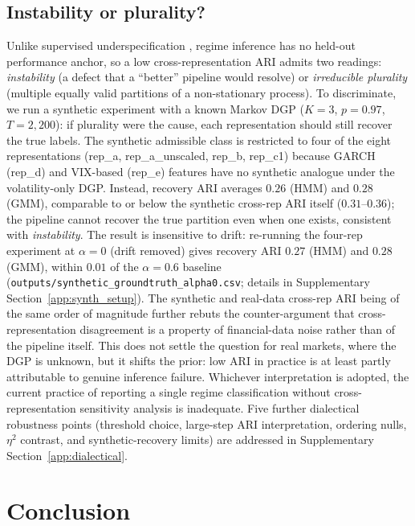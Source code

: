 \documentclass[preprint,12pt,authoryear]{elsarticle}
\begin{document}
\subsection{Instability or plurality?}
\label{sec:discussion}

Unlike supervised underspecification \citep{DAmouretal2022}, regime inference has no held-out performance anchor, so a low cross-representation ARI admits two readings: \emph{instability} (a defect that a ``better'' pipeline would resolve) or \emph{irreducible plurality} (multiple equally valid partitions of a non-stationary process). To discriminate, we run a synthetic experiment with a known Markov DGP ($K=3$, $p=0.97$, $T=2{,}200$): if plurality were the cause, each representation should still recover the true labels. The synthetic admissible class is restricted to four of the eight representations (rep\_a, rep\_a\_unscaled, rep\_b, rep\_c1) because GARCH (rep\_d) and VIX-based (rep\_e) features have no synthetic analogue under the volatility-only DGP. Instead, recovery ARI averages $0.26$ (HMM) and $0.28$ (GMM), comparable to or below the synthetic cross-rep ARI itself ($0.31$--$0.36$); the pipeline cannot recover the true partition even when one exists, consistent with \emph{instability}. The result is insensitive to drift: re-running the four-rep experiment at $\alpha=0$ (drift removed) gives recovery ARI $0.27$ (HMM) and $0.28$ (GMM), within $0.01$ of the $\alpha=0.6$ baseline (\texttt{outputs/synthetic\_groundtruth\_alpha0.csv}; details in Supplementary Section~\ref{app:synth_setup}). The synthetic and real-data cross-rep ARI being of the same order of magnitude further rebuts the counter-argument that cross-representation disagreement is a property of financial-data noise rather than of the pipeline itself. This does not settle the question for real markets, where the DGP is unknown, but it shifts the prior: low ARI in practice is at least partly attributable to genuine inference failure. Whichever interpretation is adopted, the current practice of reporting a single regime classification without cross-representation sensitivity analysis is inadequate. Five further dialectical robustness points (threshold choice, large-step ARI interpretation, ordering nulls, $\eta^2$ contrast, and synthetic-recovery limits) are addressed in Supplementary Section~\ref{app:dialectical}.

\section{Conclusion}
\label{sec:conclusion}
\end{document}
